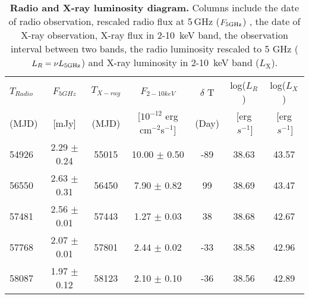 \begin{table*}
\centering
\caption{{\bf Radio and X-ray luminosity diagram.} Columns include the date of radio observation, rescaled radio flux at 5$\,$GHz ($F_{\rm{5GHz}}$)  , the date of X-ray observation,  X-ray flux in 2-10~keV band, the observation interval between two bands, the radio luminosity rescaled to 5 GHz ($L_R=\nu L_{\rm{5GHz}}$) and X-ray luminosity in 2-10~keV band ($L_\mathrm{X}$).}
\label{tab:radio_xray}
\begin{tabular}{lcccccc}
\hline
\hline

$T_{Radio}$ & $F_{5GHz}$  & $T_{X-ray}$  & $F_{2-10keV}$ & $\delta$ T & log($L_{R}$) &log($L_{X}$) \\ 
(MJD) & [mJy]& (MJD) &[$10^{-12}$ erg cm$^{-2}$\rm{s}$^{-1}$]   &(Day)   & [erg$~s^{-1}$] &[erg$~s^{-1}$] \\
\hline

54926 & 2.29 $\pm$ 0.24 & 55015 & 10.00 $\pm$ 0.50 & -89 & 38.63 & 43.57 \\
56550 & 2.63 $\pm$ 0.31 & 56450 & 7.90 $\pm$ 0.82 & 99 & 38.69 & 43.47 \\
57481 & 2.56 $\pm$ 0.01 & 57443 & 1.27 $\pm$ 0.03 & 38 & 38.68 & 42.67 \\
57768 & 2.07 $\pm$ 0.01 & 57801 & 2.44 $\pm$ 0.02 & -33 & 38.58 & 42.96 \\
58087 & 1.97 $\pm$ 0.12 & 58123 & 2.10 $\pm$ 0.10 & -36 & 38.56 & 42.89 \\



 \hline
\end{tabular}\\
\end{table*}